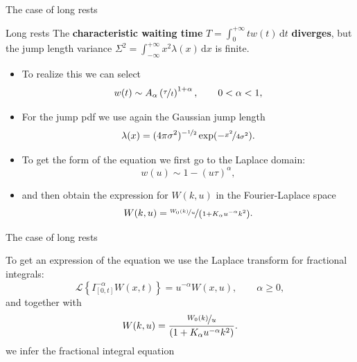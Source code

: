 \documentclass[aspectratio=169,xcolor=dvipsnames]{beamer}
\begin{document}
\begin{frame}{The case of long rests}

\begin{block}{\faBed\; Long rests}
The \textbf{characteristic waiting time} $T = \int_{0}^{+\infty} t w(t)\,\textrm{d}t$ \textbf{diverges}, but the jump length variance $\Sigma^2 = \int_{-\infty}^{+\infty} x^2\lambda(x)\,\textrm{d}x$ is finite.
\end{block}

\begin{itemize}
	\item<2-> To realize this we can select
	\[
	w(t) \sim  A_\alpha \left(\nicefrac{\tau}{t}\right)^{1+\alpha}, \qquad 0 < \alpha < 1,
	\]
	\item<3-> For the jump pdf we use again the Gaussian jump length
	\[
	\lambda(x) = (4\pi \sigma^2)^{-\nicefrac{1}{2}} \exp(-\nicefrac{x^2}{4\sigma^2}).
	\]
	\item<4-> To get the form of the equation we first go to the Laplace domain:
	\[
	w(u) \sim 1 - (u\tau)^\alpha,
	\]
	\item<5-> and then obtain the expression for $W(k,u)$ in the Fourier-Laplace space
	\[
	W(k,u) = \nicefrac{\nicefrac{W_0(k)}{u}}{\left(1 + K_\alpha u^{-\alpha} k^2\right)}.
	\]
\end{itemize}

\end{frame}

\begin{frame}{The case of long rests}

To get an expression of the equation we use the Laplace transform for fractional integrals:
\[
\mathcal{L}\left\lbrace I_{[0,t]}^{-\alpha} W(x,t) \right\rbrace = u^{-\alpha} W(x,u), \qquad \alpha \geq 0,
\]
and together with 
\[
W(k,u) = \frac{\nicefrac{W_0(k)}{u}}{\left(1 + K_\alpha u^{-\alpha} k^2\right)}.
\]
we infer the fractional integral equation
%
%
%
\end{frame}
\end{document}
